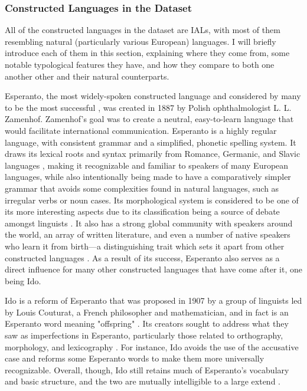 \documentclass[12pt,a4paper]{article}
\numberwithin{figure}{section}
\numberwithin{table}{section}
\numberwithin{definition}{section}
\begin{document}
\subsubsection{Constructed Languages in the Dataset}
\label{ssec:constructedlanguagesinthedataset}


All of the constructed languages in the dataset are IALs, with most of them resembling natural (particularly various European) languages. I will briefly introduce each of them in this section, explaining where they come from, some notable typological features they have, and how they compare to both one another other and their natural counterparts.

Esperanto, the most widely-spoken constructed language and considered by many to be the most successful \parencite{Gobbo2008article}, was created in 1887 by Polish ophthalmologist L. L. Zamenhof. Zamenhof’s goal was to create a neutral, easy-to-learn language that would facilitate international communication. Esperanto is a highly regular language, with consistent grammar and a simplified, phonetic spelling system. It draws its lexical roots and syntax primarily from Romance, Germanic, and Slavic languages \parencite{Gobbo2008article,Gobbo2011article}, making it recognizable and familiar to speakers of many European languages, while also intentionally being made to have a comparatively simpler grammar that avoids some complexities found in natural languages, such as irregular verbs or noun cases. Its morphological system is considered to be one of its more interesting aspects due to its classification being a source of debate amongst linguists \parencite{Reagan2019book}. It also has a strong global community with speakers around the world, an array of written literature, and even a number of native speakers who learn it from birth---a distinguishing trait which sets it apart from other constructed languages \parencite{goodall2022article}. As a result of its success, Esperanto also serves as a direct influence for many other constructed languages that have come after it, one being Ido. 


Ido is a reform of Esperanto that was proposed in 1907 by a group of linguists led by Louis Couturat, a French philosopher and mathematician, and in fact is an Esperanto word meaning "offspring" \parencite{Schubert2001book}. Its creators sought to address what they saw as imperfections in Esperanto, particularly those related to orthography, morphology, and lexicography \parencite{Novikov2022article}. For instance, Ido avoids the use of the accusative case and reforms some Esperanto words to make them more universally recognizable. Overall, though, Ido still retains much of Esperanto’s vocabulary and basic structure, and the two are mutually intelligible to a large extend \parencite{goodall2022article,Schubert2001book}.
\end{document}
